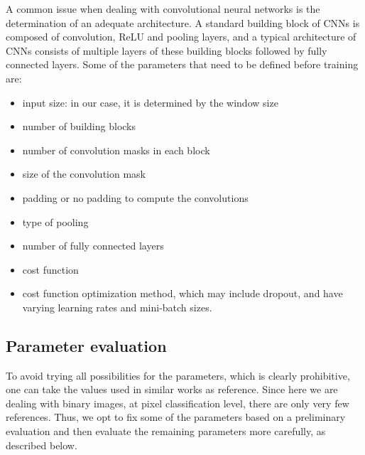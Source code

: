 \documentclass[conference]{IEEEtran}
\begin{document}
A common issue when dealing with convolutional neural 
networks is the determination of an adequate architecture. 
A standard building block of CNNs is composed of convolution, ReLU
and pooling layers, and a typical architecture of CNNs consists of
multiple layers of these building blocks followed by fully connected
layers. Some of the parameters that need to be defined before training
are:
\begin{itemize}
  \item input size: in our case, it is determined by the window size
  \item number of building blocks
  \item number of convolution masks in each block
  \item size of the convolution mask
  \item padding or no padding to compute the convolutions
  \item type of pooling
  \item number of fully connected layers
  \item cost function
  \item cost function optimization method, which may include dropout,
    and have varying learning rates and mini-batch sizes.
\end{itemize}


\subsection{Parameter evaluation}

To avoid trying all possibilities for the parameters, which is clearly
prohibitive, one can take the values used in similar works as reference.
Since here we are dealing with binary images, at pixel classification
level, there are only very few references. Thus, we opt to fix some of
the parameters based on a preliminary evaluation and then evaluate the
remaining parameters more carefully, as described below.


\end{document}
